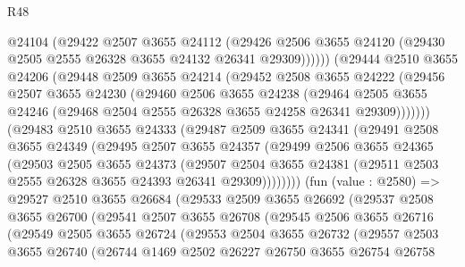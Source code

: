 \begin{lexlean}{R48}
\begin{coremodule}
              @24104
              (@29422
                @2507
                @3655
                @24112
                (@29426
                  @2506
                  @3655
                  @24120
                  (@29430 @2505 @2555 @26328 @3655 @24132 @26341 @29309))))))
        (@29444
          @2510
          @3655
          @24206
          (@29448
            @2509
            @3655
            @24214
            (@29452
              @2508
              @3655
              @24222
              (@29456
                @2507
                @3655
                @24230
                (@29460
                  @2506
                  @3655
                  @24238
                  (@29464
                    @2505
                    @3655
                    @24246
                    (@29468 @2504 @2555 @26328 @3655 @24258 @26341 @29309)))))))
        (@29483
          @2510
          @3655
          @24333
          (@29487
            @2509
            @3655
            @24341
            (@29491
              @2508
              @3655
              @24349
              (@29495
                @2507
                @3655
                @24357
                (@29499
                  @2506
                  @3655
                  @24365
                  (@29503
                    @2505
                    @3655
                    @24373
                    (@29507
                      @2504
                      @3655
                      @24381
                      (@29511 @2503 @2555 @26328 @3655 @24393 @26341 @29309))))))))
        (fun (value : @2580) =>
        @29527
          @2510
          @3655
          @26684
          (@29533
            @2509
            @3655
            @26692
            (@29537
              @2508
              @3655
              @26700
              (@29541
                @2507
                @3655
                @26708
                (@29545
                  @2506
                  @3655
                  @26716
                  (@29549
                    @2505
                    @3655
                    @26724
                    (@29553
                      @2504
                      @3655
                      @26732
                      (@29557
                        @2503
                        @3655
                        @26740
                        (@26744
                          @1469
                          @2502
                          @26227
                          @26750
                          @3655
                          @26754
                          @26758

\end{coremodule}
\end{lexlean}
